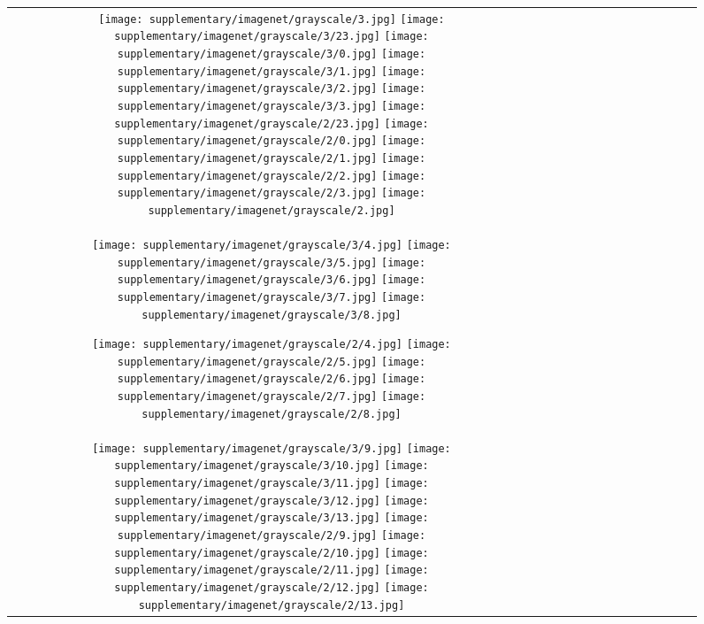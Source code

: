 \begin{figure*}[tb!]
    \centering
    \setlength{\tabcolsep}{0.5pt}
    {\small
    \renewcommand{\arraystretch}{0.5} 
    \begin{tabular}{c c c c c c c c c c c c c c }
    \captionsetup{type=figure, font=scriptsize}
  \texttt{[image: supplementary/imagenet/grayscale/3.jpg]}
  \texttt{[image: supplementary/imagenet/grayscale/3/23.jpg]}
  \texttt{[image: supplementary/imagenet/grayscale/3/0.jpg]}
  \texttt{[image: supplementary/imagenet/grayscale/3/1.jpg]}
  \texttt{[image: supplementary/imagenet/grayscale/3/2.jpg]}
  \texttt{[image: supplementary/imagenet/grayscale/3/3.jpg]}
    \hspace{5mm}
  \texttt{[image: supplementary/imagenet/grayscale/2/23.jpg]}
  \texttt{[image: supplementary/imagenet/grayscale/2/0.jpg]}
  \texttt{[image: supplementary/imagenet/grayscale/2/1.jpg]}
  \texttt{[image: supplementary/imagenet/grayscale/2/2.jpg]}
  \texttt{[image: supplementary/imagenet/grayscale/2/3.jpg]}
  \texttt{[image: supplementary/imagenet/grayscale/2.jpg]}

 \tabularnewline
  \texttt{[image: supplementary/imagenet/grayscale/3/4.jpg]}
  \texttt{[image: supplementary/imagenet/grayscale/3/5.jpg]}
  \texttt{[image: supplementary/imagenet/grayscale/3/6.jpg]}
  \texttt{[image: supplementary/imagenet/grayscale/3/7.jpg]}
  \texttt{[image: supplementary/imagenet/grayscale/3/8.jpg]}
    \hspace{5mm}
    
  \texttt{[image: supplementary/imagenet/grayscale/2/4.jpg]}
  \texttt{[image: supplementary/imagenet/grayscale/2/5.jpg]}
  \texttt{[image: supplementary/imagenet/grayscale/2/6.jpg]}
  \texttt{[image: supplementary/imagenet/grayscale/2/7.jpg]}
  \texttt{[image: supplementary/imagenet/grayscale/2/8.jpg]}
\tabularnewline
  \texttt{[image: supplementary/imagenet/grayscale/3/9.jpg]}
  \texttt{[image: supplementary/imagenet/grayscale/3/10.jpg]}
  \texttt{[image: supplementary/imagenet/grayscale/3/11.jpg]}
  \texttt{[image: supplementary/imagenet/grayscale/3/12.jpg]}
  \texttt{[image: supplementary/imagenet/grayscale/3/13.jpg]}
    \hspace{5mm}
  \texttt{[image: supplementary/imagenet/grayscale/2/9.jpg]}
  \texttt{[image: supplementary/imagenet/grayscale/2/10.jpg]}
  \texttt{[image: supplementary/imagenet/grayscale/2/11.jpg]}
  \texttt{[image: supplementary/imagenet/grayscale/2/12.jpg]}
  \texttt{[image: supplementary/imagenet/grayscale/2/13.jpg]}


\end{tabular}}
\end{figure*}
